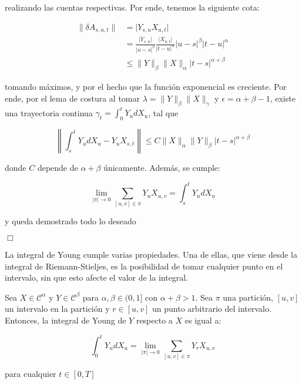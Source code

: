 realizando las cuentas respectivas. Por ende, tenemos la siguiente cota:

\begin{align*}
	\lVert \delta A_{s,u,t} \rVert &= \lvert Y_{s,u} X_{u,t} \rvert \\
	&= \frac{ \lvert Y_{s,u} \rvert }{ \lvert u - s \rvert^{\beta} } \frac{ \lvert X_{u,t} \rvert  }{ \lvert t - u \rvert^{\alpha} } \lvert u - s \rvert^{\beta} \lvert t - u \rvert^{\alpha} \\
	&\leq \lVert Y \rVert_{\beta} \lVert X \rVert_{\alpha} \lvert t - s \rvert^{\alpha + \beta}
\end{align*}

tomando máximos, y por el hecho que la función exponencial es creciente. Por ende, por el lema de costura al tomar $\lambda = \lVert Y \rVert_{\beta} \lVert X \rVert_\gamma$ y $\epsilon = \alpha + \beta - 1$, existe una trayectoria continua $\gamma_{t} = \int_0^t Y_u dX_u$, tal que

\[
	\left \lVert \int_s^t Y_u dX_u - Y_u X_{s,t} \right \rVert \leq C \lVert X \rVert_{\alpha} \lVert Y \rVert_{\beta} \lvert t - s \rvert^{\alpha + \beta} 
\]

donde $C$ depende de $\alpha + \beta$ únicamente. Además, se cumple:

\[
	\lim_{ \lvert \pi \rvert \rightarrow 0 } \sum_{ [u,v] \in \pi } Y_u X_{u,v} = \int_s^t Y_u dX_u
\]

y queda demostrado todo lo deseado

\begin{flushright}
	$\Box$
\end{flushright}

La integral de Young cumple varias propiedades. Una de ellas, que viene desde la integral de Riemann-Stieljes, es la posibilidad de tomar cualquier punto en el intervalo, sin que esto afecte el valor de la integral.

\begin{lema}
Sea $X \in \mathcal{C}^{\alpha}$ y $Y \in \mathcal{C}^{\beta}$ para $\alpha, \beta \in (0,1]$ con $\alpha + \beta > 1$. Sea $\pi$ una partición, $[u,v]$ un intervalo en la partición y $r \in [u,v]$ un punto arbitrario del intervalo. Entonces, la integral de Young de $Y$ respecto a $X$ es igual a:

\[
	\int_0^t Y_u d X_u = \lim_{ \lvert \pi \rvert \rightarrow 0} \sum_{ [u,v] \in \pi } Y_r X_{u,v}
\]

para cualquier $t \in [0,T]$

\end{lema}

